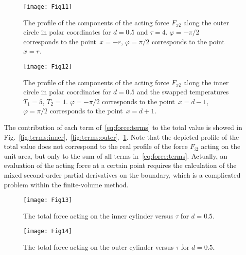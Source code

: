 \documentclass[smallextended]{svjour3} %
\begin{document}
\begin{figure}[ht]
    \centering
    \begin{minipage}{.48\textwidth}
        \centering
        \texttt{[image: Fig11]}
        \caption{The profile of the components of the acting force \(F_{x2}\) along
                the outer circle in polar coordinates for \(d=0.5\) and \(\tau=4\).
                \(\varphi = -\pi/2\) corresponds to the point~\(x=-r\),
                \(\varphi = \pi/2\) corresponds to the point~\(x=r\).}
        \label{fig:terms:outer}
    \end{minipage}
    \quad
    \begin{minipage}{.48\textwidth}
        \centering
        \texttt{[image: Fig12]}
        \caption{The profile of the components of the acting force \(F_{x2}\)
                along the inner circle in polar coordinates
                for \(d=0.5\) and the swapped temperatures \(T_1 = 5\), \(T_2 = 1\).
                \(\varphi = -\pi/2\) corresponds to the point~\(x=d-1\),
                \(\varphi = \pi/2\) corresponds to the point~\(x=d+1\).}
        \label{fig:terms:inner-swap}
    \end{minipage}
\end{figure}

The contribution of each term of~\eqref{eq:force:terms} to the total value is showed
in Fig.~\ref{fig:terms:inner},~\ref{fig:terms:outer},~\ref{fig:terms:inner-swap}.
Note that the depicted profile of the total value does not correspond to the real profile of the force \(F_{i2}\)
acting on the unit area, but only to the sum of all terms in~\eqref{eq:force:terms}.
Actually, an evaluation of the acting force at a certain point requires the calculation
of the mixed second-order partial derivatives on the boundary,
which is a complicated problem within the finite-volume method.

\begin{figure}[ht]
    \centering
    \begin{minipage}{.48\textwidth}
        \centering
        \texttt{[image: Fig13]}
        \caption{The total force acting on the inner cylinder versus \(\tau\) for \(d=0.5\).}
        \label{fig:tau:force-inner}
    \end{minipage}
    \quad
    \begin{minipage}{.48\textwidth}
        \centering
        \texttt{[image: Fig14]}
        \caption{The total force acting on the outer cylinder versus \(\tau\) for \(d=0.5\).}
        \label{fig:tau:force-outer}
    \end{minipage}
\end{figure}
\end{document}
